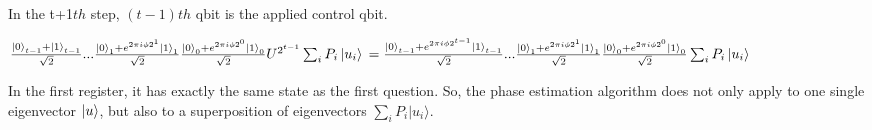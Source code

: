 \documentclass[12pt]{article}
\begin{document}
\begin{enumerate}
In the t+1$th$ step, $(t-1)th$ qbit is the applied control qbit.

$
    \frac{\ket{0}_{t-1}+\ket{1}_{t-1}}{\sqrt{2}}...\frac{\ket{0}_{1}+e^{2\pi i\phi 2^1}\ket{1}_{1}}{\sqrt{2}}\frac{\ket{0}_{0}+e^{2\pi i\phi 2^0}\ket{1}_{0}}{\sqrt{2}}U^{2^{t-1}}\sum_i P_i \ket{u_i}
    \\=\frac{\ket{0}_{t-1}+e^{2\pi i\phi 2^{t-1}}\ket{1}_{t-1}}{\sqrt{2}}...\frac{\ket{0}_{1}+e^{2\pi i\phi 2^1}\ket{1}_{1}}{\sqrt{2}}\frac{\ket{0}_{0}+e^{2\pi i\phi 2^0}\ket{1}_{0}}{\sqrt{2}}\sum_i P_i \ket{u_i}
$

In the first register, it has exactly the same state as the first question. So, the phase estimation algorithm does not only apply to one single eigenvector $\ket{u}$, but also to a superposition of eigenvectors $\sum_i P_i |u_i\rangle$.

\end{enumerate}
\end{document}
